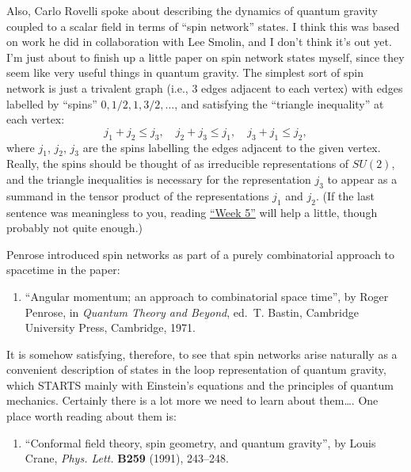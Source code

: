 \documentclass{article}
\def\tightlist{}
\begin{document}
Also, Carlo Rovelli spoke about describing the dynamics of quantum
gravity coupled to a scalar field in terms of ``spin network'' states. I
think this was based on work he did in collaboration with Lee Smolin,
and I don't think it's out yet. I'm just about to finish up a little
paper on spin network states myself, since they seem like very useful
things in quantum gravity. The simplest sort of spin network is just a
trivalent graph (i.e., 3 edges adjacent to each vertex) with edges
labelled by ``spins'' \(0,1/2,1,3/2,\ldots\), and satisfying the
``triangle inequality'' at each vertex:
\[j_1 + j_2 \leqslant j_3, \quad j_2 + j_3 \leqslant j_1, \quad j_3 + j_1 \leqslant j_2,\]
where \(j_1\), \(j_2\), \(j_3\) are the spins labelling the edges
adjacent to the given vertex. Really, the spins should be thought of as
irreducible representations of \(SU(2)\), and the triangle inequalities
is necessary for the representation \(j_3\) to appear as a summand in
the tensor product of the representations \(j_1\) and \(j_2\). (If the
last sentence was meaningless to you, reading
\protect\hyperlink{week5}{``Week 5''} will help a little, though
probably not quite enough.)

Penrose introduced spin networks as part of a purely combinatorial
approach to spacetime in the paper:

\begin{enumerate}
\def\labelenumi{\arabic{enumi})}
\setcounter{enumi}{1}
\tightlist
\item
  ``Angular momentum; an approach to combinatorial space time'', by
  Roger Penrose, in \emph{Quantum Theory and Beyond}, ed.~T. Bastin,
  Cambridge University Press, Cambridge, 1971.
\end{enumerate}

It is somehow satisfying, therefore, to see that spin networks arise
naturally as a convenient description of states in the loop
representation of quantum gravity, which STARTS mainly with Einstein's
equations and the principles of quantum mechanics. Certainly there is a
lot more we need to learn about them\ldots. One place worth reading
about them is:

\begin{enumerate}
\def\labelenumi{\arabic{enumi})}
\setcounter{enumi}{2}
\tightlist
\item
  ``Conformal field theory, spin geometry, and quantum gravity'', by
  Louis Crane, \emph{Phys. Lett.} \textbf{B259} (1991), 243--248.
\end{enumerate}
\end{document}
